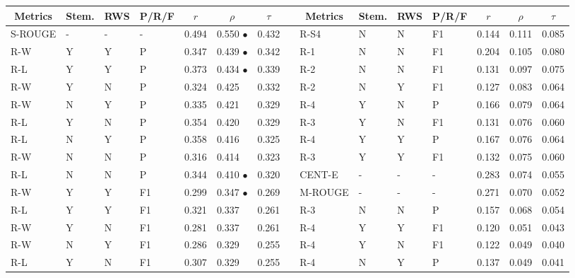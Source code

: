 \documentclass[11pt,a4paper]{article}
\begin{document}
\begin{table}[]
{
\scriptsize
\centering
\begin{tabular}{lllllllllllllll}
\hline
\multicolumn{1}{c}{Metrics} & \multicolumn{1}{c}{Stem.} & \multicolumn{1}{c}{RWS} & \multicolumn{1}{c}{P/R/F} & \multicolumn{1}{c}{$r$} & \multicolumn{1}{c}{$\rho$} & \multicolumn{1}{c}{$\tau$} & \multicolumn{1}{c}{} & \multicolumn{1}{c}{Metrics} & \multicolumn{1}{c}{Stem.} & \multicolumn{1}{c}{RWS} & \multicolumn{1}{c}{P/R/F} & \multicolumn{1}{c}{$r$} & \multicolumn{1}{c}{$\rho$} & \multicolumn{1}{c}{$\tau$} \\ \hline
\textsc{S-ROUGE} & - & - & - & 0.494 & 0.550 $\bullet$ & 0.432 &  & \textsc{R-S4} & N & N & F1 & 0.144 & 0.111 & 0.085 \\
\textsc{R-W} & Y & Y & P & 0.347 & 0.439 $\bullet$ & 0.342 &  & \textsc{R-1} & N & N & F1 & 0.204 & 0.105 & 0.080 \\
\textsc{R-L} & Y & Y & P & 0.373 & 0.434 $\bullet$ & 0.339 &  & \textsc{R-2} & N & N & F1 & 0.131 & 0.097 & 0.075 \\
\textsc{R-W} & Y & N & P & 0.324 & 0.425 & 0.332 &  & \textsc{R-2} & N & Y & F1 & 0.127 & 0.083 & 0.064 \\
\textsc{R-W} & N & Y & P & 0.335 & 0.421 & 0.329 &  & \textsc{R-4} & Y & N & P & 0.166 & 0.079 & 0.064 \\
\textsc{R-L} & Y & N & P & 0.354 & 0.420 & 0.329 &  & \textsc{R-3} & Y & N & F1 & 0.131 & 0.076 & 0.060 \\
\textsc{R-L} & N & Y & P & 0.358 & 0.416 & 0.325 &  & \textsc{R-4} & Y & Y & P & 0.167 & 0.076 & 0.064 \\
\textsc{R-W} & N & N & P & 0.316 & 0.414 & 0.323 &  & \textsc{R-3} & Y & Y & F1 & 0.132 & 0.075 & 0.060 \\
\textsc{R-L} & N & N & P & 0.344 & 0.410 $\bullet$ & 0.320 &  & \textsc{CENT-E} & - & - & - & 0.283 & 0.074 & 0.055 \\
\textsc{R-W} & Y & Y & F1 & 0.299 & 0.347 $\bullet$ & 0.269 &  & \textsc{M-ROUGE} & - & - & - & 0.271 & 0.070 & 0.052 \\
\textsc{R-L} & Y & Y & F1 & 0.321 & 0.337 & 0.261 &  & \textsc{R-3} & N & N & P & 0.157 & 0.068 & 0.054 \\
\textsc{R-W} & Y & N & F1 & 0.281 & 0.337 & 0.261 &  & \textsc{R-4} & Y & Y & F1 & 0.120 & 0.051 & 0.043 \\
\textsc{R-W} & N & Y & F1 & 0.286 & 0.329 & 0.255 &  & \textsc{R-4} & Y & N & F1 & 0.122 & 0.049 & 0.040 \\
\textsc{R-L} & Y & N & F1 & 0.307 & 0.329 & 0.255 &  & \textsc{R-4} & N & Y & P & 0.137 & 0.049 & 0.041 \\

\end{tabular}}
\end{table}
\end{document}
